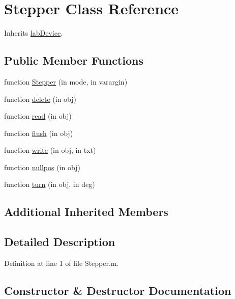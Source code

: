 \hypertarget{class_stepper}{}\section{Stepper Class Reference}
\label{class_stepper}


Inherits \hyperlink{classlab_device}{lab\+Device}.

\subsection*{Public Member Functions}
\begin{DoxyCompactItemize}
\item 
function \hyperlink{class_stepper_aa4f62f9f2f81f3e06d8b975d52ee680c}{Stepper} (in mode, in varargin)
\item 
function \hyperlink{class_stepper_a9a5b14b0e09de7315a3695b0c38c00d8}{delete} (in obj)
\item 
function \hyperlink{class_stepper_a4bce363f98e8f973e67bbdcd9517b430}{read} (in obj)
\item 
function \hyperlink{class_stepper_a09e1d2bca7c3ec73d92659cc4a57a3c7}{flush} (in obj)
\item 
function \hyperlink{class_stepper_ada9181b2569a0d9235abeac683133384}{write} (in obj, in txt)
\item 
function \hyperlink{class_stepper_ab5a1152af6d956e4e05baa0d35efcca7}{nullpos} (in obj)
\item 
function \hyperlink{class_stepper_a59922bf2f911a664e791ae9ef74bb983}{turn} (in obj, in deg)
\end{DoxyCompactItemize}
\subsection*{Additional Inherited Members}


\subsection{Detailed Description}


Definition at line 1 of file Stepper.\+m.



\subsection{Constructor \& Destructor Documentation}
\mbox{\label{class_stepper_aa4f62f9f2f81f3e06d8b975d52ee680c}} 
